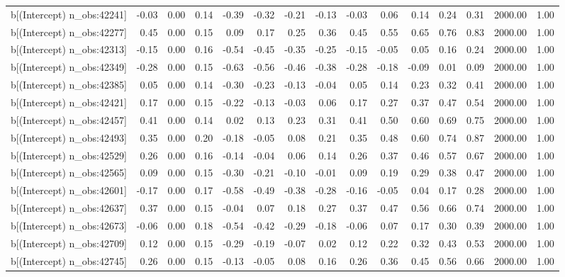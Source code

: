 \begin{table}[ht]
\begin{tabular}{rrrrrrrrrrrrrrr}
  b[(Intercept) n\_obs:42241] & -0.03 & 0.00 & 0.14 & -0.39 & -0.32 & -0.21 & -0.13 & -0.03 & 0.06 & 0.14 & 0.24 & 0.31 & 2000.00 & 1.00 \\ 
  b[(Intercept) n\_obs:42277] & 0.45 & 0.00 & 0.15 & 0.09 & 0.17 & 0.25 & 0.36 & 0.45 & 0.55 & 0.65 & 0.76 & 0.83 & 2000.00 & 1.00 \\ 
  b[(Intercept) n\_obs:42313] & -0.15 & 0.00 & 0.16 & -0.54 & -0.45 & -0.35 & -0.25 & -0.15 & -0.05 & 0.05 & 0.16 & 0.24 & 2000.00 & 1.00 \\ 
  b[(Intercept) n\_obs:42349] & -0.28 & 0.00 & 0.15 & -0.63 & -0.56 & -0.46 & -0.38 & -0.28 & -0.18 & -0.09 & 0.01 & 0.09 & 2000.00 & 1.00 \\ 
  b[(Intercept) n\_obs:42385] & 0.05 & 0.00 & 0.14 & -0.30 & -0.23 & -0.13 & -0.04 & 0.05 & 0.14 & 0.23 & 0.32 & 0.41 & 2000.00 & 1.00 \\ 
  b[(Intercept) n\_obs:42421] & 0.17 & 0.00 & 0.15 & -0.22 & -0.13 & -0.03 & 0.06 & 0.17 & 0.27 & 0.37 & 0.47 & 0.54 & 2000.00 & 1.00 \\ 
  b[(Intercept) n\_obs:42457] & 0.41 & 0.00 & 0.14 & 0.02 & 0.13 & 0.23 & 0.31 & 0.41 & 0.50 & 0.60 & 0.69 & 0.75 & 2000.00 & 1.00 \\ 
  b[(Intercept) n\_obs:42493] & 0.35 & 0.00 & 0.20 & -0.18 & -0.05 & 0.08 & 0.21 & 0.35 & 0.48 & 0.60 & 0.74 & 0.87 & 2000.00 & 1.00 \\ 
  b[(Intercept) n\_obs:42529] & 0.26 & 0.00 & 0.16 & -0.14 & -0.04 & 0.06 & 0.14 & 0.26 & 0.37 & 0.46 & 0.57 & 0.67 & 2000.00 & 1.00 \\ 
  b[(Intercept) n\_obs:42565] & 0.09 & 0.00 & 0.15 & -0.30 & -0.21 & -0.10 & -0.01 & 0.09 & 0.19 & 0.29 & 0.38 & 0.47 & 2000.00 & 1.00 \\ 
  b[(Intercept) n\_obs:42601] & -0.17 & 0.00 & 0.17 & -0.58 & -0.49 & -0.38 & -0.28 & -0.16 & -0.05 & 0.04 & 0.17 & 0.28 & 2000.00 & 1.00 \\ 
  b[(Intercept) n\_obs:42637] & 0.37 & 0.00 & 0.15 & -0.04 & 0.07 & 0.18 & 0.27 & 0.37 & 0.47 & 0.56 & 0.66 & 0.74 & 2000.00 & 1.00 \\ 
  b[(Intercept) n\_obs:42673] & -0.06 & 0.00 & 0.18 & -0.54 & -0.42 & -0.29 & -0.18 & -0.06 & 0.07 & 0.17 & 0.30 & 0.39 & 2000.00 & 1.00 \\ 
  b[(Intercept) n\_obs:42709] & 0.12 & 0.00 & 0.15 & -0.29 & -0.19 & -0.07 & 0.02 & 0.12 & 0.22 & 0.32 & 0.43 & 0.53 & 2000.00 & 1.00 \\ 
  b[(Intercept) n\_obs:42745] & 0.26 & 0.00 & 0.15 & -0.13 & -0.05 & 0.08 & 0.16 & 0.26 & 0.36 & 0.45 & 0.56 & 0.66 & 2000.00 & 1.00 \\ 

\end{tabular}
\end{table}
